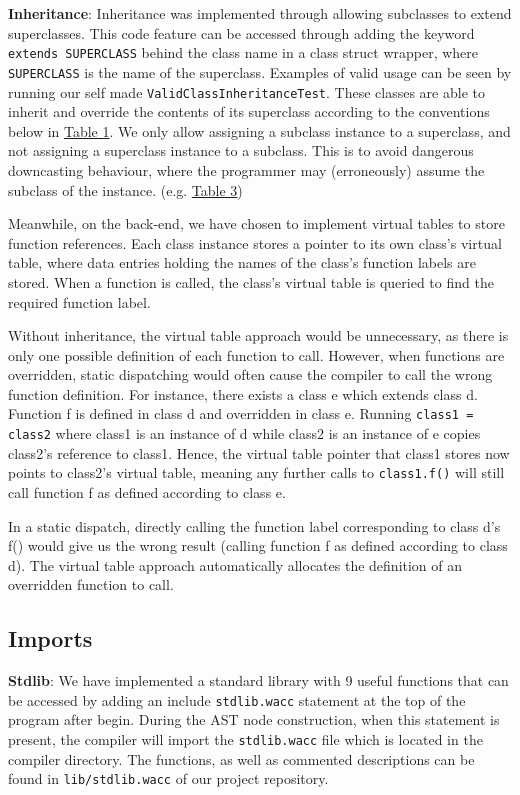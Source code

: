 \documentclass[11pt,a4paper]{article}
\newcommand{\cmd}[1]{\texttt{#1}}
\begin{document}
\noindent \textbf{Inheritance}: Inheritance was implemented through allowing subclasses to extend superclasses. This code feature can be accessed through adding the keyword \cmd{extends SUPERCLASS} behind the class name in a class struct wrapper, where \cmd{SUPERCLASS} is the name of the superclass. Examples of valid usage can be seen by running our self made \cmd{ValidClassInheritanceTest}.
These classes are able to inherit and override the contents of its superclass according to the conventions below in \hyperref[sec:table1]{Table 1}. We only allow assigning a subclass instance to a superclass, and not assigning a superclass instance to a subclass. This is to avoid dangerous downcasting behaviour, where the programmer may (erroneously) assume the subclass of the instance. (e.g. \hyperref[sec:table23]{Table 3})

Meanwhile, on the back-end, we have chosen to implement virtual tables to store function references. Each class instance stores a pointer to its own class’s virtual table, where data entries holding the names of the class’s function labels are stored. When a function is called, the class’s virtual table is queried to find the required function label. 

Without inheritance, the virtual table approach would be unnecessary, as there is only one possible definition of each function to call. However, when functions are overridden, static dispatching would often cause the compiler to call the wrong function definition. For instance, there exists a class e which extends class d. Function f is defined in class d and overridden in class e. Running \cmd{class1 = class2} where class1 is an instance of d while class2 is an instance of e copies class2’s reference to class1. Hence, the virtual table pointer that class1 stores now points to class2’s virtual table, meaning any further calls to \cmd{class1.f()} will still call function f as defined according to class e. 

In a static dispatch, directly calling the function label corresponding to class d’s f() would give us the wrong result (calling function f as defined according to class d). The virtual table approach automatically allocates the definition of an overridden function to call. 

\subsection{Imports}
\noindent \textbf{Stdlib}: We have implemented a standard library with 9 useful functions that can be accessed by adding an include \cmd{stdlib.wacc} statement at the top of the program after begin. During the AST node construction, when this statement is present, the compiler will import the \cmd{stdlib.wacc} file which is located in the compiler directory. The functions, as well as commented descriptions can be found in \cmd{lib/stdlib.wacc} of our project repository.
\newline
\end{document}
